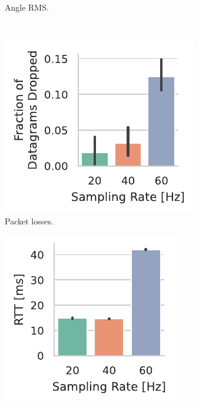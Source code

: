 \begin{figure}[t]
\begin{subfigure}[h]{.45\textwidth}
        \caption{Angle \gls{RMS}.}\label{paper:olguinmunoz2022cleave:fig:video:rms}
    \end{subfigure}\\
    \begin{subfigure}[h]{.45\textwidth}
        \centering
        \includegraphics[width=\textwidth]{publications/2022CLEAVE/plots/fixed_video_drop_frac}
        \caption{Packet losses.}\label{paper:olguinmunoz2022cleave:fig:video:drop}
    \end{subfigure}%
    \begin{subfigure}[h]{.45\textwidth}
        \centering
        \includegraphics[width=\textwidth]{publications/2022CLEAVE/plots/fixed_video_rtt}

\end{subfigure}
\end{figure}
